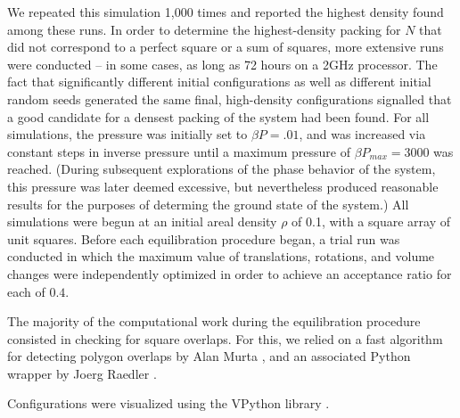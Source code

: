 \documentclass[preprint,aps]{revtex4}
\begin{document}
We repeated this simulation 1,000 times and reported the highest density found among these runs.  In order to determine the highest-density packing for $N$ that did not correspond to a perfect square or a sum of squares, more extensive runs were conducted -- in some cases, as long as 72 hours on a 2GHz processor.  The fact that significantly different initial configurations as well as different initial random seeds generated the same final, high-density configurations signalled that a good candidate for a densest packing of the system had been found.  For all simulations, the pressure was initially set to $\beta P=.01$, and was increased via constant steps in inverse pressure until a maximum pressure of $\beta P_{max}=3000$ was reached. (During subsequent explorations of the phase behavior of the system, this pressure was later deemed excessive, but nevertheless produced reasonable results for the purposes of determing the ground state of the system.) All simulations were begun at an initial areal density $\rho$ of 0.1, with a square array of unit squares. Before each equilibration procedure began, a trial run was conducted in which the maximum value of translations, rotations, and volume changes were independently optimized in order to achieve an acceptance ratio for each of $0.4$. 

The majority of the computational work during the equilibration procedure consisted in checking for square overlaps.  For this, we relied on a fast algorithm for detecting polygon overlaps by Alan Murta \cite{Murta}, and an associated Python wrapper by Joerg Raedler \cite{Radler}.

Configurations were visualized using the VPython library \cite{Scherer2000}.



\end{document}
